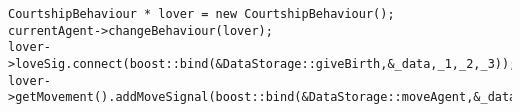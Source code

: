 \begin{lstlisting}[style=c++]
CourtshipBehaviour * lover = new CourtshipBehaviour();
currentAgent->changeBehaviour(lover);
lover->loveSig.connect(boost::bind(&DataStorage::giveBirth,&_data,_1,_2,_3));
lover->getMovement().addMoveSignal(boost::bind(&DataStorage::moveAgent,&_data,_1,_2,_3));
\end{lstlisting}